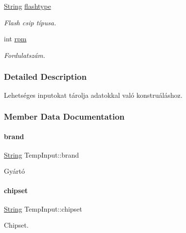 \begin{DoxyCompactItemize}
\mbox{\hyperlink{class_string}{String}} \mbox{\hyperlink{struct_temp_input_aca0d9830369aab845fc274c6b54ffe33}{flashtype}}
\begin{DoxyCompactList}\small\item\em Flash csip típusa. \end{DoxyCompactList}\item 
int \mbox{\hyperlink{struct_temp_input_a661104db14326156bbb2ffa5a7c6f468}{rpm}}
\begin{DoxyCompactList}\small\item\em Fordulatszám. \end{DoxyCompactList}\end{DoxyCompactItemize}


\subsubsection{Detailed Description}
Lehetséges inputokat tárolja adatokkal való konstruáláshoz. 

\subsubsection{Member Data Documentation}
\mbox{\label{struct_temp_input_ae61ec1c3c483e583e4975e5c728e4886}} 
\paragraph{\texorpdfstring{brand}{brand}}
{\footnotesize\ttfamily \mbox{\hyperlink{class_string}{String}} Temp\+Input\+::brand}



Gyártó 

\mbox{\label{struct_temp_input_a29da394f96dae5eaa49e145207362a9c}} 
\paragraph{\texorpdfstring{chipset}{chipset}}
{\footnotesize\ttfamily \mbox{\hyperlink{class_string}{String}} Temp\+Input\+::chipset}



Chipset. 

\mbox{\label{struct_temp_input_aa76fe14a614fef6e9239ce2283d6b102}} 
